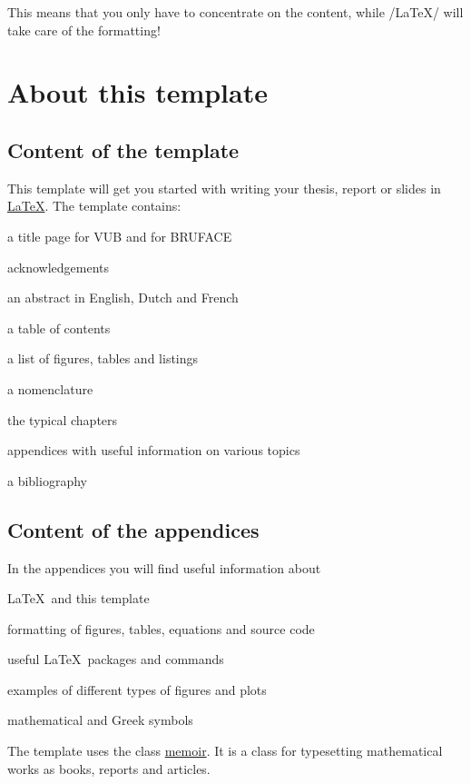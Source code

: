 This means that you only have to concentrate on the content, while /LaTeX/ will take care of the formatting!


\section{About this template}
\subsection{Content of the template}
This template will get you started with writing your thesis, report or slides in \href{https://www.latex-project.org}{\LaTeX}. The template contains:
\begin{itemshort}
    \item a title page for VUB and for BRUFACE
    \item acknowledgements
    \item an abstract in English, Dutch and French
    \item a table of contents
    \item a list of figures, tables and listings
    \item a nomenclature
    \item the typical chapters
    \item appendices with useful information on various topics
    \item a bibliography
\end{itemshort}

\subsection{Content of the appendices}
In the appendices you will find useful information about
\begin{itemshort}
    \item \LaTeX\ and this template
    \item formatting of figures, tables, equations and source code
    \item useful \LaTeX\ packages and commands
    \item examples of different types of figures and plots
    \item mathematical and Greek symbols
\end{itemshort}

The template uses the class \href{https://ctan.org/pkg/memoir?lang=en}{memoir}. It is a class for typesetting mathematical works as books, reports and articles.

